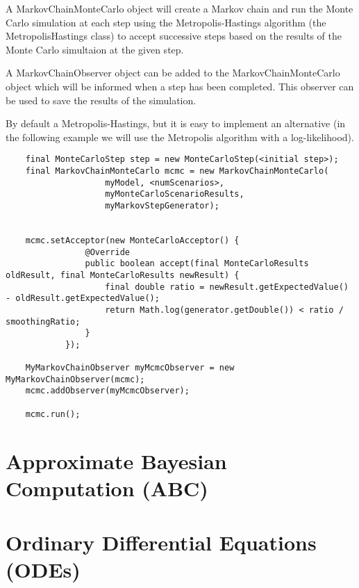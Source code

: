 A MarkovChainMonteCarlo object will create a Markov chain and run the Monte Carlo simulation at each step using the Metropolis-Hastings algorithm (the MetropolisHastings class) to accept successive steps based on the results of the Monte Carlo simultaion at the given step.

A MarkovChainObserver object can be added to the MarkovChainMonteCarlo object which will be informed when a step has been completed. This observer can be used to save the results of the simulation.

By default a Metropolis-Hastings, but it is easy to implement an alternative (in the following example we will use the Metropolis algorithm with a log-likelihood).

\begin{lstlisting}
    final MonteCarloStep step = new MonteCarloStep(<initial step>);
    final MarkovChainMonteCarlo mcmc = new MarkovChainMonteCarlo(
                    myModel, <numScenarios>,
                    myMonteCarloScenarioResults,
                    myMarkovStepGenerator);


    mcmc.setAcceptor(new MonteCarloAcceptor() {
                @Override
                public boolean accept(final MonteCarloResults oldResult, final MonteCarloResults newResult) {
                    final double ratio = newResult.getExpectedValue() - oldResult.getExpectedValue();
                    return Math.log(generator.getDouble()) < ratio / smoothingRatio;
                }
            });

    MyMarkovChainObserver myMcmcObserver = new MyMarkovChainObserver(mcmc);
    mcmc.addObserver(myMcmcObserver);

    mcmc.run();
\end{lstlisting}


\section{Approximate Bayesian Computation (ABC)}

\section{Ordinary Differential Equations (ODEs)}



